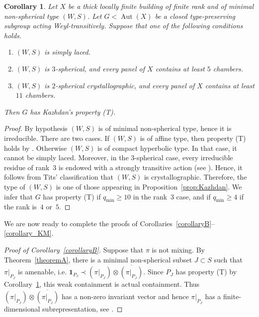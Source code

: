 \documentclass[12pt,a4paper]{amsproc}
\newtheorem{corollary}[theorem]{Corollary}
\theoremstyle{definition}
\DeclareMathOperator{\Aut}{Aut}
\newcommand{\one}{\mathbf 1}
\newcommand{\ol}[1]{\overline{#1}}
\newcommand{\weakcontain}{\prec}
\newcommand{\qmin}{q_{\mathrm{min}}}
\begin{document}
	
\begin{corollary}\label{cor:minimal-non-sph:Kazhdan}
Let $X$ be a thick locally finite building of finite rank and of minimal non-spherical type $(W, S)$. Let $G<\Aut(X)$ be a closed type-preserving subgroup acting Weyl-transitively. Suppose that one of the following conditions holds. 
\begin{enumerate}[label=(\arabic*)]
\item $(W, S)$ is simply laced. 
\item $(W, S)$ is $3$-spherical, and every panel of $X$  contains at least $5$ chambers. 
\item $(W, S)$ is $2$-spherical crystallographic, and every panel of $X$ contains  at least $11$ chambers.
\end{enumerate}

Then $G$ has Kazhdan's property (T). 
\end{corollary}
\begin{proof}
By hypothesis $(W, S)$ is of minimal non-spherical type, hence it is irreducible. 
There are two cases. If  $(W, S)$ is of affine type, then property (T) holds by \cite{Oppenheim}. Otherwise $(W, S)$ is of compact hyperbolic type. In that case, it cannot be simply laced.  Moreover, in the $3$-spherical case, every irreducible residue of rank~$3$ is endowed with a strongly transitive action (see \cite[Proposition~6.15]{AbramenkoBrown}). Hence, it follows from Tits' classification \cite[Theorem~11.4]{Tits74} that $(W, S)$ is crystallographic. Therefore, the type of $(W, S)$ is one of those appearing in  Proposition~\ref{prop:Kazhdan}. We infer that $G$ has property (T) if $\qmin \geq 10$ in the rank~$3$ case, and if $\qmin \geq 4$ if the rank is~$4$ or~$5$. 
\end{proof}

 
We are now ready to complete the proofs of Corollaries~\ref{corollaryB}--\ref{corollary_KM}.

\begin{proof}[Proof of Corollary~\ref{corollaryB}]
Suppose that $\pi$ is not mixing. By Theorem~\ref{theoremA}, there is a minimal non-spherical subset $J\subset S$ such that $\pi|_{P_J}$ is amenable, i.e. $\one_{P_J}\weakcontain(\pi|_{P_J})\otimes\ol{(\pi|_{P_J})}$. Since $P_J$ has property (T) by Corollary~\ref{cor:minimal-non-sph:Kazhdan}, this weak containment is actual containment. Thus $(\pi|_{P_J})\otimes\ol{(\pi|_{P_J})}$ has a non-zero invariant vector and hence $\pi|_{P_J}$ has a finite-dimensional subrepresentation, see \cite[Proposition~A.1.12]{BHV}.
\end{proof}
\end{document}
